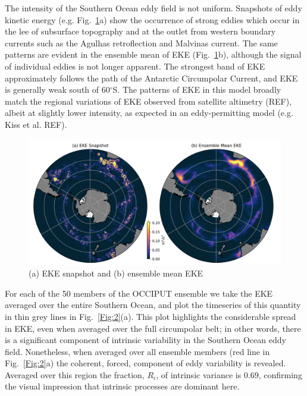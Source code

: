 \documentclass{agujournal2019-navid}
\begin{document}
The intensity of the Southern Ocean eddy field is not uniform.
Snapshots of eddy kinetic energy (e.g. Fig.~\ref{Fig:1}a) show the occurrence of strong eddies which occur in the lee of subsurface topography and at the outlet from western boundary currents such as the Agulhas retroflection and Malvinas current.
The same patterns are evident in the ensemble mean of EKE (Fig.~\ref{Fig:1}b), although the signal of individual eddies is not longer apparent.
The strongest band of EKE approximately follows the path of the Antarctic Circumpolar Current, and EKE is generally weak south of 60$^\circ$S.
The patterns of EKE in this model broadly match the regional variations of EKE observed from satellite altimetry (REF), albeit at slightly lower intensity, as expected in an eddy-permitting model (e.g. Kiss et al. REF).

\begin{figure}[ht]
\begin{center}
\includegraphics[width=\hsize]{Figure1}
\caption{(a) EKE snapshot and (b) ensemble mean EKE  }
\label{Fig:1}
\end{center}
\end{figure}

For each of the 50 members of the OCCIPUT ensemble we take the EKE averaged over the entire Southern Ocean, and plot the timeseries of this quantity in thin grey lines in Fig.~\ref{Fig:2}(a). 
This plot highlights the considerable spread in EKE, even when averaged over the full circumpolar belt; in other words, there is a significant component of intrinsic variability in the Southern Ocean eddy field.
Nonetheless, when averaged over all ensemble members (red line in Fig.~\ref{Fig:2}a) the coherent, forced, component of eddy variability is revealed.
Averaged over this region the fraction, $R_i$, of intrinsic variance is 0.69, confirming the visual impression that intrinsic processes are dominant here.
\end{document}

